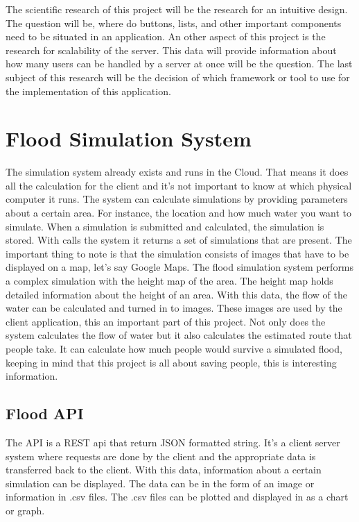The scientific research of this project will be the research for an intuitive design. The question will be, where do buttons, lists, and other important components need to be situated in an application. An other aspect of this project is the research for scalability of the server. This data will provide information about how many users can be handled by a server at once will be the question. The last subject of this research will be the decision of which framework or tool to use for the implementation of this application.

\section{Flood Simulation System}
The simulation system already exists and runs in the Cloud. That means it does all the calculation for the client and it's not important to know at which physical computer it runs. The system can calculate simulations by providing parameters about a certain area. For instance, the location and how much water you want to simulate. When a simulation is submitted and calculated, the simulation is stored. With calls the system it returns a set of simulations that are present. The important thing to note is that the simulation consists of images that have to be displayed on a map, let's say Google Maps. The flood simulation system performs a complex simulation with the height map of the area. The height map holds detailed information about the height of an area. With this data, the flow of the water can be calculated and turned in to images. These images are used by the client application, this an important part of this project.
Not only does the system calculates the flow of water but it also calculates the estimated route that people take. It can calculate how much people would survive a simulated flood, keeping in mind that this project is all about saving people, this is interesting information.
 
\subsection{Flood API}
The API is a REST api that return JSON formatted string. It's a client server system where requests are done by the client and the appropriate data is transferred back to the client. With this data, information about a certain simulation can be displayed. The data can be in the form of an image or information in .csv files. The .csv files can be plotted and displayed in as a chart or graph.

